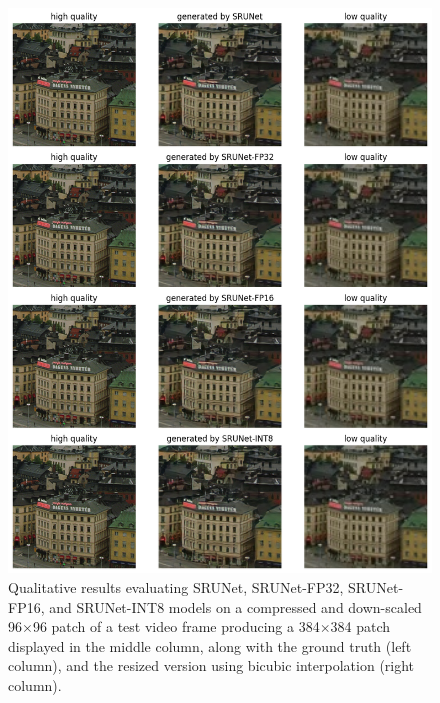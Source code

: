 \begin{figure}[ht]
\includegraphics[width=1.0\textwidth]{static/01_srunet_qualitative_results.png}
\caption{Qualitative results evaluating SRUNet, SRUNet-FP32, SRUNet-FP16, and SRUNet-INT8 models on a compressed and down-scaled 96$\times$96 patch of a test video frame producing a 384$\times$384 patch displayed in the middle column, along with the ground truth (left column), and the resized version using bicubic interpolation (right column).}
\label{fig:building-qualitative-srunet}
\end{figure}


